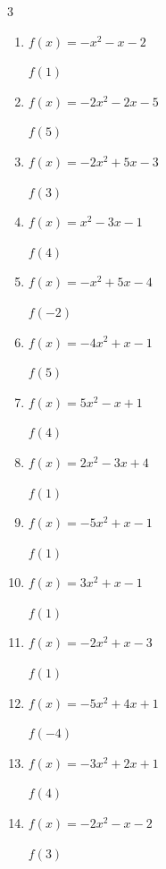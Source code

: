 \begin{multicols}{3}
\begin{enumerate}
$f(3)$
        \phantom{$= -62$}

  \item $f(x)=-x^{2}-x-2$

$f(1)$
        \phantom{$= -4$}

  \item $f(x)=-2x^{2}-2x-5$

$f(5)$
        \phantom{$= -65$}

  \item $f(x)=-2x^{2}+5x-3$

$f(3)$
        \phantom{$= -6$}

  \item $f(x)=x^{2}-3x-1$

$f(4)$
        \phantom{$= 3$}

  \item $f(x)=-x^{2}+5x-4$

$f(-2)$
        \phantom{$= -18$}

  \item $f(x)=-4x^{2}+x-1$

$f(5)$
        \phantom{$= -96$}

  \item $f(x)=5x^{2}-x+1$

$f(4)$
        \phantom{$= 77$}

  \item $f(x)=2x^{2}-3x+4$

$f(1)$
        \phantom{$= 3$}

  \item $f(x)=-5x^{2}+x-1$

$f(1)$
        \phantom{$= -5$}

  \item $f(x)=3x^{2}+x-1$

$f(1)$
        \phantom{$= 3$}

  \item $f(x)=-2x^{2}+x-3$

$f(1)$
        \phantom{$= -4$}

  \item $f(x)=-5x^{2}+4x+1$

$f(-4)$
        \phantom{$= -95$}

  \item $f(x)=-3x^{2}+2x+1$

$f(4)$
        \phantom{$= -39$}

  \item $f(x)=-2x^{2}-x-2$

$f(3)$
        \phantom{$= -23$}


\end{enumerate}
\end{multicols}
